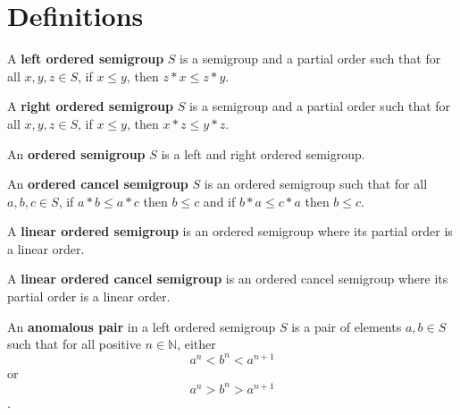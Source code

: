 \section{Definitions}

\begin{definition}\label{def:LeftOrderedSemigroup}
    \leanok
    A \textbf{left ordered semigroup} $S$ is a semigroup and a partial order
    such that for all $x, y, z\in S$,
    if $x \le y$, then $z * x \le z * y$.
\end{definition}

\begin{definition}\label{def:RightOrderedSemigroup}
    \leanok
    A \textbf{right ordered semigroup} $S$ is a semigroup and a partial order
    such that for all $x, y, z\in S$,
    if $x \le y$, then $x * z \le y * z$.
\end{definition}

\begin{definition}\label{def:OrderedSemigroup}
    \leanok
An \textbf{ordered semigroup} $S$ is a
left and right ordered semigroup.
\end{definition}

\begin{definition}\label{def:OrderedCancelSemigroup}\leanok
{}
An \textbf{ordered cancel semigroup} $S$ is an ordered semigroup such that for all $a,b,c\in S$,
if $a * b \le a * c$ then $b \le c$ and if $b * a \le c * a$ then $b \le c$.
\end{definition}

\begin{definition}\label{def:LinearOrderedSemigroup}\leanok
{}
A \textbf{linear ordered semigroup} is an ordered semigroup where its partial order is a linear order.
\end{definition}

\begin{definition}\label{def:LinearOrderedCancelSemigroup}\leanok
{}
A \textbf{linear ordered cancel semigroup} is an ordered cancel semigroup where its partial order is a linear order.
\end{definition}

\begin{definition}\label{def:anomalous_pair}
    \leanok
    An \textbf{anomalous pair} in a left ordered semigroup $S$
    is a pair of elements $a,b \in S$ such that
    for all positive $n \in \mathbb{N}$, either
    \[
        a^n < b^n < a^{n+1}
    \]
    or
    \[
        a^n > b^n > a^{n+1}
    \].
\end{definition}

